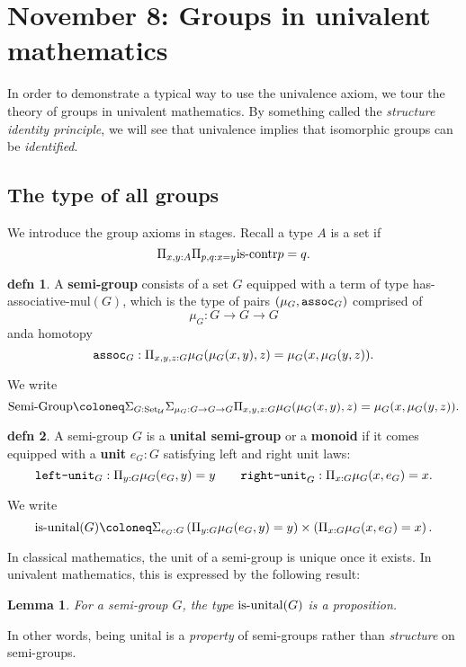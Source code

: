 \documentclass{amsart}
\theoremstyle{theorem}
\newtheorem*{lem}{Lemma}
\theoremstyle{definition}
\newtheorem*{defn}{defn}
\theoremstyle{remark}
\newcommand{\0}{\mathbbe{0}}
\newcommand{\1}{\mathbbe{1}}
\newcommand{\2}{\mathbbe{2}}
\newcommand{\3}{\mathbbe{3}}
\newcommand{\4}{\mathbbe{4}}
\newcommand{\term}[1]{{\textup{\texttt{#1}}}}
\newcommand{\type}[1]{{\textup{#1}}}
\newcommand{\UU}{{\mathcal{U}}}
\newcommand{\is}[1]{\type{is-{#1}}}
\newcommand{\iscontr}{\type{is-contr}}
\newcommand{\Set}{\type{Set}_{\UU}}
\begin{document}
\section*{November 8: Groups in univalent mathematics}

 In order to demonstrate a typical way to use the univalence axiom, we tour the theory of groups in univalent mathematics. By something called the \emph{structure identity principle}, we will see that univalence implies that isomorphic groups can be \emph{identified}. 
 
 \subsection*{The type of all groups}
 
We introduce the group axioms in stages. Recall a type $A$ is a set if
\[ \Pi_{x,y:A} \Pi_{p,q: x=y} \iscontr{p=q}.\]

\begin{defn} A \textbf{semi-group} consists of a set $G$ equipped with a term of type \type{has-associative-mul}$(G)$, which is the type of pairs $(\mu_G,\term{assoc}_G)$ comprised of
\[ \mu_G : G \to G \to G\] anda  homotopy
\[ \term{assoc}_G : \Pi_{x,y,z:G} \mu_G(\mu_G(x,y),z) = \mu_G(x,\mu_G(y,z)).\]
\end{defn}

We write
\[ \type{Semi-Group} \coloneq \Sigma_{G: \Set}\Sigma_{\mu_G :G \to G \to G} \Pi_{x,y,z:G} \mu_G(\mu_G(x,y),z) = \mu_G(x,\mu_G(y,z)).\]

\begin{defn} A semi-group $G$ is a \textbf{unital semi-group} or a \textbf{monoid} if it comes equipped with a \textbf{unit} $e_G : G$ satisfying left and right unit laws:
\[ \term{left-unit}_G : \Pi_{y:G} \mu_G(e_G,y) = y  \qquad \term{right-unit}_G :\Pi_{x:G} \mu_G(x,e_G) = x.\]
\end{defn}

We write
\[ \is{unital}(G) \coloneq  \Sigma_{e_G: G} \left( \Pi_{y:G} \mu_G(e_G,y) = y  \right) \times \left( \Pi_{x:G} \mu_G(x,e_G) = x \right).\]

In classical mathematics, the unit of a semi-group is unique once it exists. In univalent mathematics, this is expressed by the following result:

\begin{lem} For a semi-group $G$, the type $\is{unital}(G)$ is a proposition.
\end{lem}

In other words, being unital is a \emph{property} of semi-groups rather than \emph{structure} on semi-groups.
\end{document}

